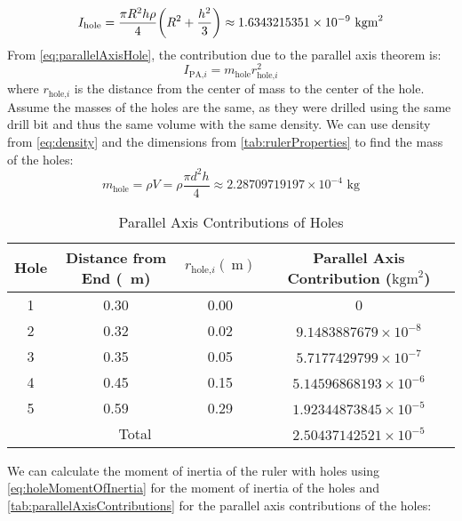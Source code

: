 \documentclass[article, 12pt]{article}
\DeclarePairedDelimiter\paren{(}{)} %
\begin{document}
\begin{enumerate}[1)]
    \begin{equation}
        I_\text{hole}   = \frac{\pi R^2h\rho}{4} \paren*{R^2 + \frac{h^2}{3}} \approx 1.6343215351 \times 10^{-9} \text{ kgm}^2
        \label{eq:holeMomentOfInertia}
    \end{equation}
    From \autoref{eq:parallelAxisHole}, the contribution due to the parallel axis theorem is:
    \begin{equation}
        I_{\text{PA,}i} = m_{\text{hole}}r_{\text{hole,}i}^2
        \label{eq:parallelAxisContribution}
    \end{equation}
    where $r_{\text{hole,}i}$ is the distance from the center of mass to the center of the hole. Assume the masses of the holes are the same, as they were drilled using the same drill bit and thus the same volume with the same density. We can use density from \autoref{eq:density} and the dimensions from \autoref{tab:rulerProperties} to find the mass of the holes:
    \begin{equation}
        m_{\text{hole}} = \rho V = \rho \frac{\pi d^2 h}{4} \approx 2.28709719197 \times 10^{-4} \text{ kg}
    \end{equation}
    \begin{table}[H]
        \centering
        \begin{tabular}{|c|c|c|c|}
            \hline
            Hole & Distance from End (\SI{}{\meter}) & $r_{\text{hole,}i} (\SI{}{\meter})$ & Parallel Axis Contribution ($\text{kgm}^2$)\\
            \hline
            1 & 0.30 & 0.00 & 0 \\
            2 & 0.32 & 0.02 & $9.1483887679 \times 10^{-8}$ \\
            3 & 0.35 & 0.05 & $5.7177429799 \times 10^{-7}$ \\
            4 & 0.45 & 0.15 & $5.14596868193 \times 10^{-6}$ \\
            5 & 0.59 & 0.29 & $1.92344873845 \times 10^{-5}$ \\
            \hline
            \multicolumn{3}{|c|}{Total} & $2.50437142521 \times 10^{-5}$ \\
            \hline
        \end{tabular}
        \caption{Parallel Axis Contributions of Holes}
        \label{tab:parallelAxisContributions}
    \end{table}
    We can calculate the moment of inertia of the ruler with holes using \autoref{eq:holeMomentOfInertia} for the moment of inertia of the holes and \autoref{tab:parallelAxisContributions} for the parallel axis contributions of the holes:

\end{enumerate}
\end{document}
